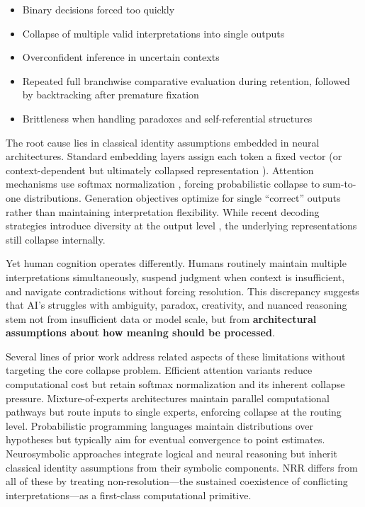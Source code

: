 \documentclass[11pt,a4paper]{article}
\begin{document}
\begin{itemize}
\item Binary decisions forced too quickly
\item Collapse of multiple valid interpretations into single outputs
\item Overconfident inference in uncertain contexts
\item Repeated full branchwise comparative evaluation during retention, followed by backtracking after premature fixation
\item Brittleness when handling paradoxes and self-referential structures
\end{itemize}

The root cause lies in classical identity assumptions embedded in neural architectures.
Standard embedding layers assign each token a fixed vector (or context-dependent but ultimately collapsed representation \cite{peters2018deep}).
Attention mechanisms use softmax normalization \cite{vaswani2017attention}, forcing probabilistic collapse to sum-to-one distributions.
Generation objectives optimize for single ``correct'' outputs rather than maintaining interpretation flexibility.
While recent decoding strategies introduce diversity at the output level \cite{holtzman2020curious, li2023contrastive}, the underlying representations still collapse internally.

Yet human cognition operates differently.
Humans routinely maintain multiple interpretations simultaneously, suspend judgment when context is insufficient, and navigate contradictions without forcing resolution.
This discrepancy suggests that AI's struggles with ambiguity, paradox, creativity, and nuanced reasoning stem not from insufficient data or model scale, but from \textbf{architectural assumptions about how meaning should be processed}.

Several lines of prior work address related aspects of these limitations without targeting the core collapse problem.
Efficient attention variants \cite{child2019generating, dao2022flashattention} reduce computational cost but retain softmax normalization and its inherent collapse pressure.
Mixture-of-experts architectures \cite{shazeer2017outrageously} maintain parallel computational pathways but route inputs to single experts, enforcing collapse at the routing level.
Probabilistic programming languages \cite{goodman2008church} maintain distributions over hypotheses but typically aim for eventual convergence to point estimates.
Neurosymbolic approaches \cite{garcez2020neural} integrate logical and neural reasoning but inherit classical identity assumptions from their symbolic components.
NRR differs from all of these by treating non-resolution---the sustained coexistence of conflicting interpretations---as a first-class computational primitive.
\end{document}
